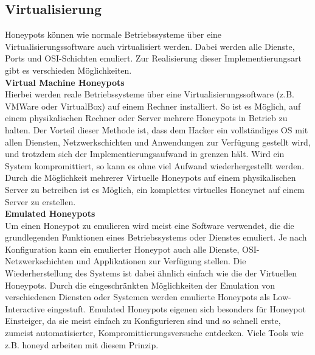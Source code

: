 \subsection{Virtualisierung}
Honeypots können wie normale Betriebssysteme über eine Virtualisierungssoftware auch virtualisiert werden. Dabei werden alle Dienste, Ports und OSI-Schichten emuliert. Zur Realisierung dieser Implementierungsart gibt es verschieden Möglichkeiten.\\

\noindent\textbf{Virtual Machine Honeypots}\\
Hierbei werden reale Betriebssysteme über eine Virtualisierungssoftware (z.B. VMWare oder VirtualBox) auf einem Rechner installiert. So ist es Möglich, auf einem physikalischen Rechner oder Server mehrere Honeypots in Betrieb zu halten. Der Vorteil dieser Methode ist, dass dem Hacker ein vollständiges OS mit allen Diensten, Netzwerkschichten und Anwendungen zur Verfügung gestellt wird, und trotzdem sich der Implementierungsaufwand in grenzen hält. Wird ein System kompromittiert, so kann es ohne viel Aufwand wiederhergestellt werden. Durch die Möglichkeit mehrerer Virtuelle Honeypots auf einem physikalischen Server zu betreiben ist es Möglich, ein komplettes virtuelles Honeynet auf einem Server zu erstellen\cite{grimes.2003a}.  \\

\noindent\textbf{Emulated Honeypots}\\
Um einen Honeypot zu emulieren wird meist eine Software verwendet, die die grundlegenden Funktionen eines Betriebssystems oder Dienstes emuliert. Je nach Konfiguration kann ein emulierter Honeypot auch alle Dienste, OSI-Netzwerkschichten und Applikationen zur Verfügung stellen. Die Wiederherstellung des Systems ist dabei ähnlich einfach wie die der Virtuellen Honeypots. Durch die eingeschränkten Möglichkeiten der Emulation von verschiedenen Diensten oder Systemen werden emulierte Honeypots als Low-Interactive eingestuft. Emulated Honeypots eigenen sich besonders für Honeypot Einsteiger, da sie meist einfach zu Konfigurieren sind und so schnell erste, zumeist automatisierter, Kompromittierungsversuche entdecken. Viele Tools wie z.B. honeyd arbeiten mit diesem Prinzip\cite{spitzner.2002a}.
\newpage